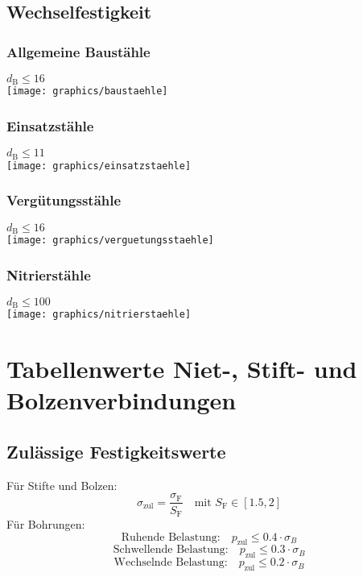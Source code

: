 \begin{multicols}{3}
	\section{Wechselfestigkeit} %
		\subsection{Allgemeine Baustähle} %
			\label{baustaehle}
			$d_{\text{B}} \leq 16$ \\
			\texttt{[image: graphics/baustaehle]}
		\subsection{Einsatzstähle} %
			\label{einsatzstaehle}
			$d_{\text{B}} \leq 11$ \\
			\texttt{[image: graphics/einsatzstaehle]}
		\subsection{Vergütungsstähle} %
			\label{verguetungsstaehle}
			$d_{\text{B}} \leq 16$ \\
			\texttt{[image: graphics/verguetungsstaehle]}
		\subsection{Nitrierstähle} %
			\label{nitrierstaehle}
			$d_{\text{B}} \leq 100$ \\
			\texttt{[image: graphics/nitrierstaehle]}
\chapter{Tabellenwerte Niet-, Stift- und Bolzenverbindungen} %
	\label{flaechenbelastungen}
	\section{Zulässige Festigkeitswerte} %
		Für Stifte und Bolzen:
		\begin{equation*}
			\sigma_{\text{zul}}=\frac{\sigma_{\text{F}}}{S_{\text{F}}} \quad \text{mit } S_{\text{F}}\in [1.5 , 2]
		\end{equation*}
		Für Bohrungen:
		\begin{equation*}
			\text{Ruhende Belastung:} \quad p_{\text{zul}} \leq 0.4 \cdot \sigma_B
		\end{equation*}
		\begin{equation*}
			\text{Schwellende Belastung:} \quad p_{\text{zul}} \leq 0.3 \cdot \sigma_B
		\end{equation*}
		\begin{equation*}
			\text{Wechselnde Belastung:} \quad p_{\text{zul}} \leq 0.2 \cdot \sigma_B
		\end{equation*}

\end{multicols}
